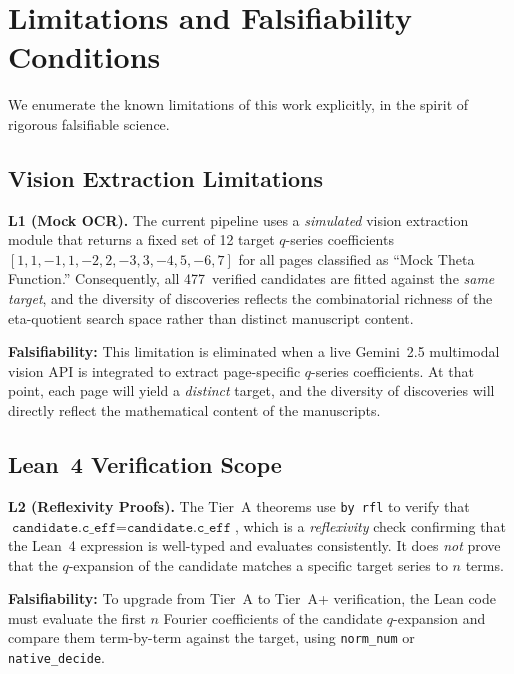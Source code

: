 \section{Limitations and Falsifiability Conditions}
\label{sec:limitations}

We enumerate the known limitations of this work explicitly,
in the spirit of rigorous falsifiable science.

\subsection{Vision Extraction Limitations}

\textbf{L1 (Mock OCR).}  The current pipeline uses a
\emph{simulated} vision extraction module that returns
a fixed set of 12 target $q$-series coefficients
$[1, 1, -1, 1, -2, 2, -3, 3, -4, 5, -6, 7]$ for all
pages classified as ``Mock Theta Function.''
Consequently, all 477~verified candidates are fitted
against the \emph{same target}, and the diversity of
discoveries reflects the combinatorial richness of the
eta-quotient search space rather than distinct manuscript
content.

\textbf{Falsifiability:}  This limitation is eliminated
when a live Gemini~2.5 multimodal vision API is
integrated to extract page-specific $q$-series
coefficients.  At that point, each page will yield a
\emph{distinct} target, and the diversity of discoveries
will directly reflect the mathematical content of the
manuscripts.

\subsection{Lean~4 Verification Scope}

\textbf{L2 (Reflexivity Proofs).}  The Tier~A theorems
use \texttt{by rfl} to verify that
$\texttt{candidate.c\_eff} = \texttt{candidate.c\_eff}$,
which is a \emph{reflexivity} check confirming that the
Lean~4 expression is well-typed and evaluates
consistently.  It does \emph{not} prove that the
$q$-expansion of the candidate matches a specific
target series to $n$ terms.

\textbf{Falsifiability:}  To upgrade from Tier~A to
Tier~A+ verification, the Lean code must evaluate the
first $n$ Fourier coefficients of the candidate
$q$-expansion and compare them term-by-term against
the target, using \texttt{norm\_num} or
\texttt{native\_decide}.

